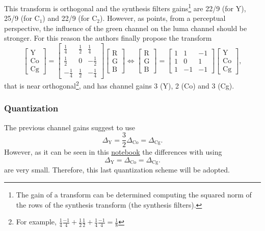 This transform is orthogonal and the synthesis filters
gains\footnote{The gain of a transform can be determined computing the
squared norm of the rows of the synthesis transform (the synthesis
filters).} are 22/9 (for Y), 25/9 (for C$_1$) and 22/9 (for C$_2$). However,
as \cite{malvar2008lifting} points, from a perceptual perspective, the
influence of the green channel on the luma channel should be
stronger. For this reason the authors finally propose the transform
\begin{equation}
  \begin{bmatrix}
    \text{Y} \\
    \text{Co} \\
    \text{Cg}
  \end{bmatrix}
  =
  \begin{bmatrix}
    \frac{1}{4} &  \frac{1}{2}  &  \frac{1}{4} \\ 
    \frac{1}{2} &            0  & -\frac{1}{2} \\
    -\frac{1}{4} &  \frac{1}{2}  & -\frac{1}{4}
  \end{bmatrix}
  \begin{bmatrix}
    \text{R} \\
    \text{G} \\
    \text{B}
  \end{bmatrix}
  \Leftrightarrow
  \begin{bmatrix}
    \text{R} \\
    \text{G} \\
    \text{B}
  \end{bmatrix}
  =
  \begin{bmatrix}
    1  &  1  & -1 \\ 
    1  &  0  &  1 \\ 
    1  & -1  & -1
  \end{bmatrix}
  \begin{bmatrix}
    \text{Y} \\
    \text{Co} \\
    \text{Cg}
  \end{bmatrix},
\end{equation}
that is near orthogonal\footnote{For example, $\frac{1}{4}\frac{-1}{4}
+ \frac{1}{2}\frac{1}{2} + \frac{1}{4}\frac{-1}{4} = \frac{1}{8}$},
and has channel gains 3 (Y), 2 (Co) and 3 (Cg). %

\subsubsection{Quantization}
The previous channel gains suggest to use
\begin{equation}
  \Delta_{\text{Y}} = \frac{3}{2}\Delta_{\text{Co}} = \Delta_{\text{Cg}}.
\end{equation}
However, as it can be seen in this \href{https://github.com/Sistemas-Multimedia/Sistemas-Multimedia.github.io/blob/master/study_guide/06-color_transform/performance.ipynb}{notebook} the differences with using
\begin{equation}
  \Delta_{\text{Y}} = \Delta_{\text{Co}} = \Delta_{\text{Cg}}.
\end{equation}
are very small. Therefore, this last quantization scheme will be adopted.

